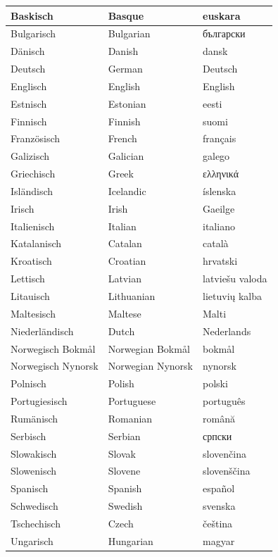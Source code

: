 \documentclass[]{../../metanetpaper}
\begin{document}
	\begin{tabular}{l|l|l}
\hline
	Baskisch & Basque & euskara\\
\hline
	Bulgarisch & Bulgarian & български\\
\hline
	Dänisch & Danish & dansk\\
\hline
	Deutsch & German & Deutsch\\
\hline
	Englisch & English & English\\
\hline
	Estnisch & Estonian & eesti\\
\hline
	Finnisch & Finnish & suomi\\
\hline
	Französisch & French & français\\
\hline
	Galizisch & Galician & galego\\
\hline
	Griechisch & Greek & ελληνικά\\
\hline
	Isländisch & Icelandic & íslenska\\
\hline
	Irisch & Irish & Gaeilge\\
\hline
	Italienisch & Italian & italiano\\
\hline
	Katalanisch & Catalan & català\\
\hline
	Kroatisch & Croatian & hrvatski\\
\hline
	Lettisch & Latvian & latviešu valoda\\
\hline
	Litauisch & Lithuanian & lietuvių kalba\\
\hline
	Maltesisch & Maltese & Malti\\
\hline
	Niederländisch & Dutch & Nederlands\\
\hline
	Norwegisch Bokmål & Norwegian Bokmål & bokmål\\
\hline
	Norwegisch Nynorsk & Norwegian Nynorsk & nynorsk\\
\hline
	Polnisch & Polish & polski\\
\hline
	Portugiesisch & Portuguese & português\\
\hline
	Rumänisch & Romanian & română\\
\hline
	Serbisch & Serbian & српски\\
\hline
	Slowakisch & Slovak & slovenčina\\
\hline
	Slowenisch & Slovene & slovenščina\\
\hline
	Spanisch & Spanish & español\\
\hline
	Schwedisch & Swedish & svenska\\
\hline
	Tschechisch & Czech & čeština\\
\hline
	Ungarisch & Hungarian & magyar\\
\end{tabular}
\end{document}
